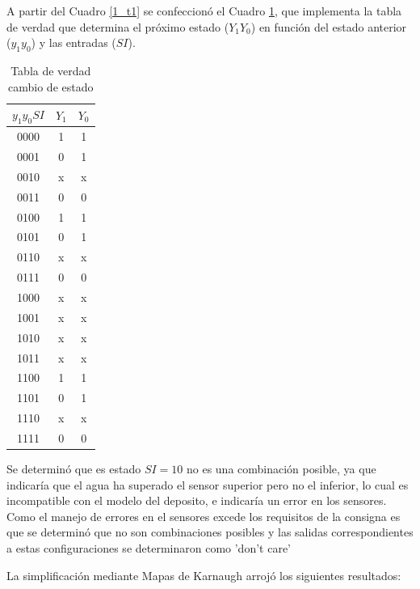\documentclass[10pt,a4paper]{article}
\begin{document}
A partir del Cuadro \ref{1_t1} se confeccionó el Cuadro \ref{1_t2}, que implementa la tabla de verdad que determina el próximo estado ($Y_1Y_0$) en función del estado anterior ($y_1y_0$) y las entradas ($SI$). 



\begin{table}[H]
	\centering
	\begin{tabular}{c|c|c}
	$y_1y_0SI$ & $Y_1$ & $Y_0$  \\ 
	\hline 
	0000 & 1 & 1  \\ 
	\hline 
	0001 & 0 & 1  \\ 
	\hline 
	0010 & x & x  \\ 
	\hline 
	0011 & 0 & 0  \\ 
	\hline 
	0100 & 1 & 1  \\ 
	\hline 
	0101 & 0 & 1  \\ 
	\hline 
	0110 & x & x  \\ 
	\hline 
	0111 & 0 & 0  \\ 
	\hline 
	1000 & x & x  \\ 
	\hline 
	1001 & x & x  \\ 
	\hline 
	1010 & x & x  \\ 
	\hline 
	1011 & x & x  \\ 
	\hline 
	1100 & 1 & 1  \\ 
	\hline 
	1101 & 0 & 1  \\ 
	\hline 
	1110 & x & x  \\ 
	\hline 
	1111 & 0 & 0  \\ 
	\end{tabular} 
	\caption{Tabla de verdad cambio de estado}
	\label{1_t2}
\end{table}

Se determinó que es estado $SI=10$ no es una combinación posible, ya que indicaría que el agua ha superado el sensor superior pero no el inferior, lo cual es incompatible con el modelo del deposito, e indicaría un error en los sensores. Como el manejo de errores en el sensores excede los requisitos de la consigna es que se determinó que no son combinaciones posibles y las salidas correspondientes a estas configuraciones se determinaron como 'don't care'

La simplificación mediante Mapas de Karnaugh arrojó los siguientes resultados:
\end{document}
